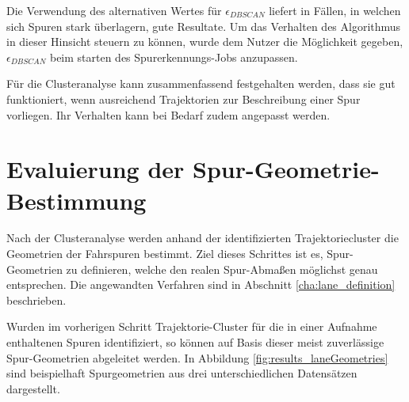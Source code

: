 Die Verwendung des alternativen Wertes für $\epsilon_{DBSCAN}$ liefert in Fällen, in welchen sich Spuren stark überlagern,
gute Resultate. Um das Verhalten des Algorithmus in dieser Hinsicht steuern zu können, wurde dem Nutzer die Möglichkeit
gegeben, $\epsilon_{DBSCAN}$ beim starten des Spurerkennungs-Jobs anzupassen.

Für die Clusteranalyse kann zusammenfassend festgehalten werden, dass sie gut funktioniert, wenn ausreichend Trajektorien
zur Beschreibung einer Spur vorliegen. Ihr Verhalten kann bei Bedarf zudem angepasst werden.

\section{Evaluierung der Spur-Geometrie-Bestimmung}

Nach der Clusteranalyse werden anhand der identifizierten Trajektoriecluster die Geometrien der Fahrspuren
bestimmt. Ziel dieses Schrittes ist es, Spur-Geometrien zu definieren, welche den realen Spur-Abmaßen möglichst
genau entsprechen. Die angewandten Verfahren sind in Abschnitt \ref{cha:lane_definition} beschrieben.

Wurden im vorherigen Schritt Trajektorie-Cluster für die in einer Aufnahme enthaltenen Spuren identifiziert,
so können auf Basis dieser meist zuverlässige Spur-Geometrien abgeleitet werden.
In Abbildung \ref{fig:results_laneGeometries} sind beispielhaft Spurgeometrien aus drei unterschiedlichen Datensätzen dargestellt.

